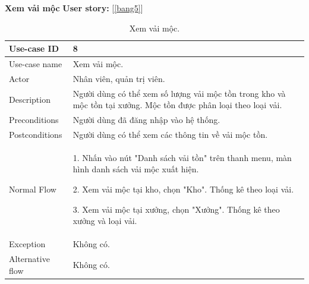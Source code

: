 \textbf{Xem vải mộc}
\textbf{User story:} [\ref{bang5}]
\begin{table}[!htp]
    \centering
    \begin{tabular}{|m{3cm}|m{10cm}|}
    \hline 
        Use-case ID & 8\\ \hline
        Use-case name & Xem vải mộc.\\ \hline
        Actor & Nhân viên, quản trị viên.\\ \hline
        Description & Người dùng có thể xem số lượng vải mộc tồn trong kho và mộc tồn tại xưởng. Mộc tồn được phân loại theo loại vải.\\ \hline
        Preconditions & Người dùng đã đăng nhập vào hệ thống.\\ \hline
        Postconditions & Người dùng có thể xem các thông tin về vải mộc tồn.\\ \hline
        Normal Flow & 
        1. Nhấn vào nút "Danh sách vải tồn" trên thanh menu, màn hình danh sách vải mộc xuất hiện.\par
        2. Xem vải mộc tại kho, chọn "Kho". Thống kê theo loại vải.\par
        3. Xem vải mộc tại xưởng, chọn "Xưởng". Thống kê theo xưởng và loại vải.
        \\ \hline
        Exception & Không có.\\ \hline
        Alternative flow & Không có.\\ 
    \hline 
    \end{tabular}
    \caption{Xem vải mộc.}
    \label{bang8}
\end{table}

